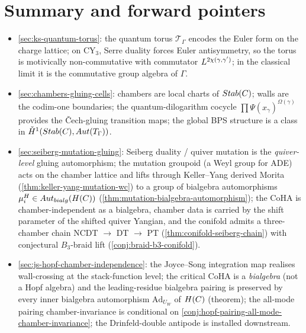 \section{Summary and forward pointers}
\label{sec:wc-summary}

\begin{itemize}[leftmargin=2em]
  \item \cref{sec:ks-quantum-torus}: the quantum torus $\mathcal{T}_\Gamma$ encodes the
        Euler form on the charge lattice; on CY$_3$, Serre duality forces
        Euler antisymmetry, so the torus is motivically non-commutative with
        commutator $L^{2\chi(\gamma, \gamma')}$; in the classical limit it
        is the commutative group algebra of $\Gamma$.
  \item \cref{sec:chambers-gluing-cells}: chambers are local charts of
        $Stab(C)$; walls are the codim-one boundaries; the
        quantum-dilogarithm cocycle $\prod \Psi(\hat{x}_\gamma)^{\Omega(\gamma)}$
        provides the \v{C}ech-gluing transition maps; the global BPS
        structure is a class in $\check{H}^1(Stab(C), Aut(T_\Gamma))$.
  \item \cref{sec:seiberg-mutation-gluing}: Seiberg duality / quiver
        mutation is the \emph{quiver-level} gluing automorphism; the
        mutation groupoid (a Weyl group for ADE) acts on the chamber
        lattice and lifts through Keller--Yang derived Morita
        (\cref{thm:keller-yang-mutation-wc}) to a group of bialgebra
        automorphisms $\mu_i^{H} \in Aut_{bialg}(H(C))$
        (\cref{thm:mutation-bialgebra-automorphism}); the CoHA is
        chamber-independent as a bialgebra, chamber data is carried by
        the shift parameter of the shifted quiver Yangian, and the
        conifold admits a three-chamber chain
        NCDT $\to$ DT $\to$ PT (\cref{thm:conifold-seiberg-chain})
        with conjectural $B_3$-braid lift
        (\cref{conj:braid-b3-conifold}).
  \item \cref{sec:js-hopf-chamber-independence}: the Joyce--Song
        integration map realises wall-crossing at the stack-function level;
        the critical CoHA is a \emph{bialgebra} (not a Hopf algebra) and
        the leading-residue bialgebra pairing is preserved by every inner
        bialgebra automorphism $\mathrm{Ad}_{U_W}$ of $H(C)$ (theorem);
        the all-mode pairing chamber-invariance is conditional on
        \cref{conj:hopf-pairing-all-mode-chamber-invariance}; the
        Drinfeld-double antipode is installed downstream.
\end{itemize}


